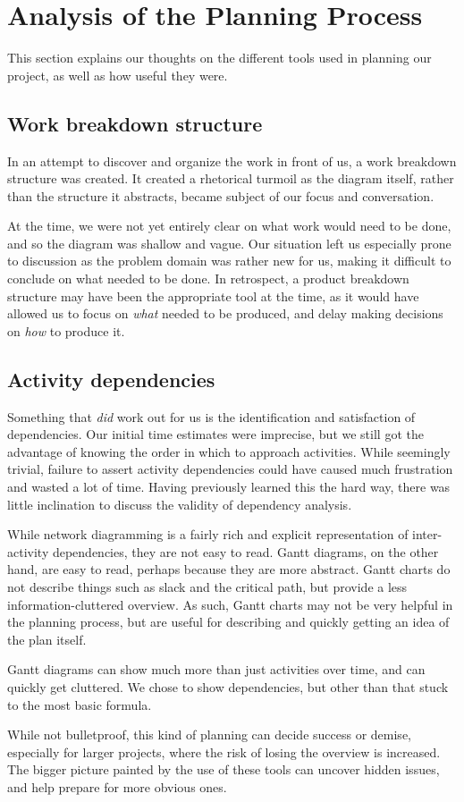\section{Analysis of the Planning Process}
\label{sec:AnalysisPlanning}

This section explains our thoughts on the different tools used in planning our
project, as well as how useful they were.

\subsection{Work breakdown structure}
In an attempt to discover and organize the work in front of us, a work
breakdown structure was created. It created a rhetorical turmoil as the
diagram itself, rather than the structure it abstracts, became subject of our
focus and conversation.

At the time, we were not yet entirely clear on what work would need to be done,
and so the diagram was shallow and vague. Our situation left us especially prone to discussion as the problem domain was rather
new for us, making it difficult to conclude on what needed to be done. In retrospect, a product breakdown
structure may have been the appropriate tool at the time, as it would have
allowed us to focus on \emph{what} needed to be produced, and delay making
decisions on \emph{how} to produce it\cite[ch.~8.3,~8.4]{caye}.

\subsection{Activity dependencies}
Something that \emph{did} work out for us is the identification and satisfaction
of dependencies. Our initial time estimates were imprecise, but we still got the
advantage of knowing the order in which to approach activities. While seemingly
trivial, failure to assert activity dependencies could have caused much
frustration and wasted a lot of time. Having previously learned this the hard way,
there was little inclination to discuss the validity of dependency analysis.

While network diagramming is a fairly rich and explicit representation of
inter-activity dependencies, they are not easy to read.  Gantt
diagrams, on the other hand, are easy to read, perhaps because they are more
abstract. Gantt charts do not describe things such as slack and the critical
path, but provide a less information-cluttered overview. As such, Gantt charts
may not be very helpful in the planning process, but are useful for describing
and quickly getting an idea of the plan itself.

Gantt diagrams can show much more than just activities over time, and can quickly
get cluttered\cite[ch.~8.6]{caye}. We chose to show dependencies, but other than
that stuck to the most basic formula.

While not bulletproof, this kind of planning can decide success or
demise\cite[ch.~8]{caye}, especially for larger projects, where the risk of
losing the overview is increased. The bigger picture painted by the use of
these tools can uncover hidden issues, and help prepare for more obvious ones.
